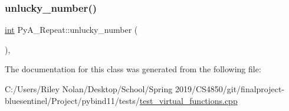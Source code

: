 \mbox{\label{class_py_a___repeat_ab5d023f398b7042b61f372d1df259b51}} 
\subsubsection{\texorpdfstring{unlucky\_number()}{unlucky\_number()}}
{\footnotesize\ttfamily \mbox{\hyperlink{warnings_8h_a74f207b5aa4ba51c3a2ad59b219a423b}{int}} Py\+A\+\_\+\+Repeat\+::unlucky\+\_\+number (\begin{DoxyParamCaption}{ }\end{DoxyParamCaption})\hspace{0.3cm}{\ttfamily [inline]}, {\ttfamily [override]}}



The documentation for this class was generated from the following file\+:\begin{DoxyCompactItemize}
\item 
C\+:/\+Users/\+Riley Nolan/\+Desktop/\+School/\+Spring 2019/\+C\+S4850/git/finalproject-\/bluesentinel/\+Project/pybind11/tests/\mbox{\hyperlink{test__virtual__functions_8cpp}{test\+\_\+virtual\+\_\+functions.\+cpp}}\end{DoxyCompactItemize}
